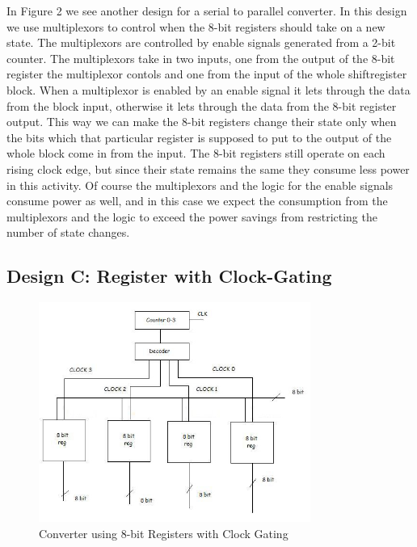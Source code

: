 \documentclass[11pt,a4paper]{article}
\begin{document}
In Figure 2 we see another design for a serial to parallel converter. In this design we use multiplexors to control when the 8-bit registers should take on a new state. The multiplexors are controlled by enable signals generated from a 2-bit counter. The multiplexors take in two inputs, one from the output of the 8-bit register the multiplexor contols and one from the input of the whole shiftregister block. When a multiplexor is enabled by an enable signal it lets through the data from the block input, otherwise it lets through the data from the 8-bit register output. This way we can make the 8-bit registers change their state only when the bits which that particular register is supposed to put to the output of the whole block come in from the input. The 8-bit registers still operate on each rising clock edge, but since their state remains the same they consume less power in this activity. Of course the multiplexors and the logic for the enable signals consume power as well, and in this case we expect the consumption from the multiplexors and the logic to exceed the power savings from restricting the number of state changes.

\subsection{Design C: Register with Clock-Gating}

\begin{figure}[htp]
\centering
\includegraphics[width = 3.5in]{./images/shiftregistergated.jpg}
\caption{Converter using 8-bit Registers with Clock Gating}
\end{figure}
\end{document}
